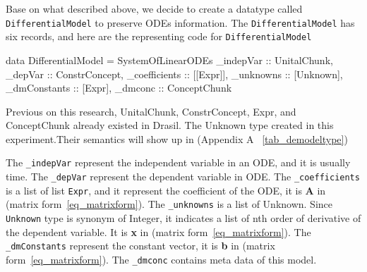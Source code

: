 Base on what described above, we decide to create a datatype called \verb|DifferentialModel| to preserve ODEs information. The \verb|DifferentialModel| has six records, and here are the representing code for \verb|DifferentialModel|
\begin{haskell1}
data DifferentialModel = SystemOfLinearODEs {
	_indepVar :: UnitalChunk,
	_depVar :: ConstrConcept,
	_coefficients :: [[Expr]],
	_unknowns :: [Unknown],
	_dmConstants :: [Expr],
	_dmconc :: ConceptChunk
}
\end{haskell1}


Previous on this research, UnitalChunk, ConstrConcept, Expr, and ConceptChunk already existed in Drasil. The Unknown type created in this experiment.Their semantics will show up in (Appendix A ~\ref{tab_demodeltype})

The \verb|_indepVar| represent the independent variable in an ODE, and it is usually time. The \verb|_depVar| represent the dependent variable in ODE. The \verb|_coefficients| is a list of list \verb|Expr|, and it represent the coefficient of the ODE, it is \textbf{A} in (matrix form~\ref{eq_matrixform}). The \verb|_unknowns| is a list of Unknown. Since \verb|Unknown| type is synonym of Integer, it indicates a list of nth order of derivative of the dependent variable. It is \textbf{x} in (matrix form~\ref{eq_matrixform}). The \verb|_dmConstants| represent the constant vector, it is \textbf{b} in (matrix form~\ref{eq_matrixform}). The \verb|_dmconc| contains meta data of this model.

